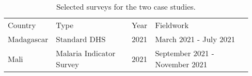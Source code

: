 \begin{table}[!t]
    \begin{tabularx}{\textwidth}{lllX}
        Country    	& Type  	    & Year 	& Fieldwork                      \\ \arrayrulecolor{black!30}\midrule
        Madagascar 	& Standard DHS 	    & 2021 	& March 2021 - July 2021         \\
        Mali       	& Malaria Indicator Survey     	& 2021 	& September 2021 - November 2021 \\
    \end{tabularx}
    \caption{Selected surveys for the two case studies.}
    \label{tab:survey_characteristics}
\end{table}